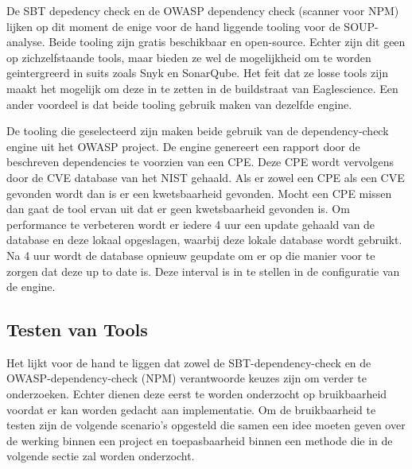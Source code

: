 \begin{itemize}
    De SBT depedency check en de OWASP dependency check (scanner voor NPM) lijken op dit moment de enige voor de hand liggende tooling voor de SOUP-analyse. Beide tooling zijn gratis beschikbaar en open-source. Echter zijn dit geen op zichzelfstaande tools, maar bieden ze wel de mogelijkheid om te worden geintergreerd in suits zoals Snyk en SonarQube. Het feit dat ze losse tools zijn maakt het mogelijk om deze in te zetten in de buildstraat van Eaglescience. Een ander voordeel is dat beide tooling gebruik maken van dezelfde engine.


    De tooling die geselecteerd zijn maken beide gebruik van de dependency-check engine uit het OWASP project.
    De engine genereert een rapport door de beschreven dependencies te voorzien van een CPE. Deze CPE wordt vervolgens door de CVE database van het NIST gehaald. Als er zowel een CPE als een CVE gevonden wordt dan is er een kwetsbaarheid gevonden. Mocht een CPE missen dan gaat de tool ervan uit dat er geen kwetsbaarheid gevonden is. Om performance te verbeteren wordt er iedere 4 uur een update gehaald van de database en deze lokaal opgeslagen, waarbij deze lokale database wordt gebruikt. Na 4 uur wordt de database opnieuw geupdate om er op die manier voor te zorgen dat deze up to date is. Deze interval is in te stellen in de configuratie van de engine.

%
%

    \subsection{Testen van Tools}\label{subsec:testen-van-tools}

    Het lijkt voor de hand te liggen dat zowel de SBT-dependency-check en de OWASP-dependency-check (NPM) verantwoorde keuzes zijn om verder te onderzoeken. Echter dienen deze eerst te worden onderzocht op bruikbaarheid voordat er kan worden gedacht aan implementatie. Om de bruikbaarheid te testen zijn de volgende scenario's opgesteld die samen een idee moeten geven over de werking binnen een project en toepasbaarheid binnen een methode die in de volgende sectie zal worden onderzocht.


\end{itemize}
